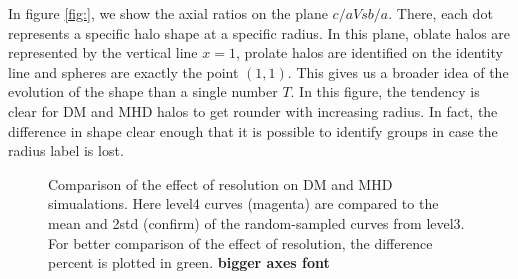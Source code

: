 In figure \ref{fig:}, we show the axial ratios on the plane $c/a Vs b/a$. There, each dot represents a specific halo shape at a specific radius. In this plane, oblate halos are represented by the vertical line $x = 1$, prolate halos are identified on the identity line and spheres are exactly the point $(1,1)$. This gives us a broader idea of the evolution of the shape than a single number $T$. In this figure, the tendency is clear for DM and MHD halos to get rounder with increasing radius. In fact, the difference in shape clear enough that it is possible to identify groups in case the radius label is lost.\\

\begin{figure}[!ht]
  \centering
  \hfill
  \caption{Comparison of the effect of resolution on DM and MHD simualations. Here level4 curves (magenta) are compared to the mean and 2std (confirm) of the random-sampled curves from level3. For better comparison of the effect of resolution, the difference percent is plotted in green.  \textbf{bigger axes font}}
\end{figure}

